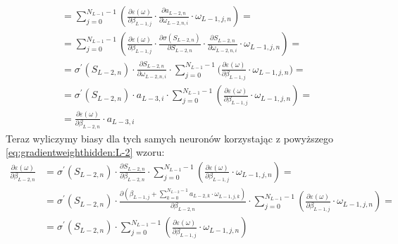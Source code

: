 \documentclass[]{article}
\begin{document}
\begin{equation}
\begin{split}
					&= \sum\limits_{j=0}^{N_{L-1}-1} \left( \frac{ \partial \varepsilon \left( \omega \right) }{ \partial \beta_{L-1,j} } \cdot \frac{ \partial a_{L-2,n} }{ \partial \omega_{L-2,n,i} } \cdot \omega_{L-1,j,n} \right) = \\
					&= \sum\limits_{j=0}^{N_{L-1}-1} \left( \frac{ \partial \varepsilon \left( \omega \right) }{ \partial \beta_{L-1,j} } \cdot \frac{ \partial \sigma \left( S_{L-2,n} \right) }{ \partial S_{L-2,n} } \cdot \frac{ \partial S_{L-2,n} }{ \partial \omega_{L-2,n,i} } \cdot \omega_{L-1,j,n} \right) = \\
					&= \sigma^{\prime}\left( S_{L-2,n} \right) \cdot \frac{ \partial S_{L-2,n} }{ \partial \omega_{L-2,n,i} } \cdot \sum\limits_{j=0}^{N_{L-1}-1} \Big( \frac{ \partial \varepsilon \left( \omega \right) }{ \partial \beta_{L-1,j} } \cdot \omega_{L-1,j,n} \Big) = \\
					&= \sigma^{\prime}\left( S_{L-2,n} \right) \cdot a_{L-3,i} \cdot \sum\limits_{j=0}^{N_{L-1}-1} \left( \frac{ \partial \varepsilon\left( \omega \right) }{ \partial \beta_{L-1,j} } \cdot \omega_{L-1,j,n} \right) = \\
					&= \frac{ \partial \varepsilon\left( \omega \right) }{ \partial \beta_{L-2,n} } \cdot a_{L-3,i}
				\end{split}
			\end{equation}
			Teraz wyliczymy biasy dla tych samych neuronów korzystając z powyższego \ref{eq:gradientweighthidden:L-2} wzoru:
			\begin{equation} \label{eq:gradientbiashidden:L-2}
				\begin{split}
					\frac{ \partial \varepsilon\left( \omega \right) }{ \partial \beta_{L-2,n} } &= \sigma^{\prime}\left( S_{L-2,n} \right) \cdot \frac{ \partial S_{L-2,n} }{ \partial \beta_{L-2,n} } \cdot \sum\limits_{j=0}^{N_{L-1}-1} \left( \frac{ \partial \varepsilon\left( \omega \right) }{ \partial \beta_{L-1,j} } \cdot \omega_{L-1,j,n} \right) = \\
					&= \sigma^{\prime}\left( S_{L-2,n} \right) \cdot \frac{ \partial \left( \beta_{L-1,j} + \sum\limits_{k=0}^{ N_{L-2}-1 } a_{L-2,k} \cdot \omega_{L-1,j,k} \right) }{ \partial \beta_{L-2,n} } \cdot \sum\limits_{j=0}^{N_{L-1}-1} \left( \frac{ \partial \varepsilon\left( \omega \right) }{ \partial \beta_{L-1,j} } \cdot \omega_{L-1,j,n} \right) = \\
					&= \sigma^{\prime}\left( S_{L-2,n} \right) \cdot \sum\limits_{j=0}^{N_{L-1}-1} \left( \frac{ \partial \varepsilon\left( \omega \right) }{ \partial \beta_{L-1,j} } \cdot \omega_{L-1,j,n} \right)
				\end{split}
			\end{equation}
			
\end{document}
